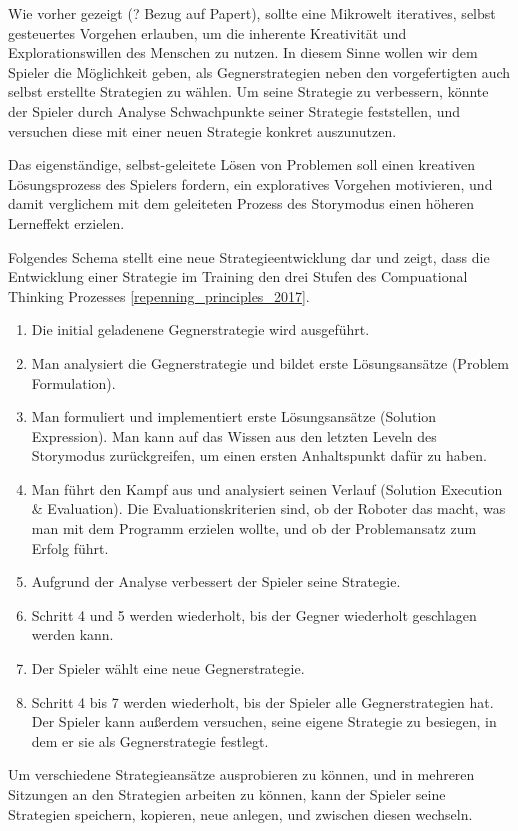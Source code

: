 Wie vorher gezeigt (? Bezug auf Papert), sollte eine Mikrowelt iteratives, selbst gesteuertes
Vorgehen erlauben, um die inherente Kreativität und Explorationswillen des Menschen zu nutzen. In
diesem Sinne wollen wir dem Spieler die Möglichkeit geben, als Gegnerstrategien neben den
vorgefertigten auch selbst erstellte Strategien zu wählen. Um seine Strategie zu verbessern, könnte
der Spieler durch Analyse Schwachpunkte seiner Strategie feststellen, und versuchen diese mit einer neuen
Strategie konkret auszunutzen.

Das eigenständige, selbst-geleitete Lösen von Problemen soll einen kreativen Lösungsprozess des
Spielers fordern, ein exploratives Vorgehen motivieren, und damit verglichem mit dem geleiteten
Prozess des Storymodus einen höheren Lerneffekt erzielen.

Folgendes Schema stellt eine neue Strategieentwicklung dar und zeigt, dass die Entwicklung einer
Strategie im Training den drei Stufen des Compuational Thinking Prozesses \ref{repenning_principles_2017}.

\begin{enumerate}
\item Die initial geladenene Gegnerstrategie wird ausgeführt.
\item Man analysiert die Gegnerstrategie und bildet erste Lösungsansätze (Problem Formulation).
\item Man formuliert und implementiert erste Lösungsansätze (Solution Expression). Man kann auf das Wissen aus den letzten
Leveln des Storymodus zurückgreifen, um einen ersten Anhaltspunkt dafür zu haben.
\item Man führt den Kampf aus und analysiert seinen Verlauf (Solution Execution \& Evaluation). Die Evaluationskriterien sind, ob der Roboter
das macht, was man mit dem Programm erzielen wollte, und ob der Problemansatz zum Erfolg führt.
\item Aufgrund der Analyse verbessert der Spieler seine Strategie.
\item Schritt 4 und 5 werden wiederholt, bis der Gegner wiederholt geschlagen werden kann.
\item Der Spieler wählt eine neue Gegnerstrategie.
\item Schritt 4 bis 7 werden wiederholt, bis der Spieler alle Gegnerstrategien hat. Der Spieler kann außerdem
versuchen, seine eigene Strategie zu besiegen, in dem er sie als Gegnerstrategie festlegt.
\end{enumerate}

Um verschiedene Strategieansätze ausprobieren zu können, und in mehreren Sitzungen an den Strategien
arbeiten zu können, kann der Spieler seine Strategien speichern, kopieren, neue anlegen, und
zwischen diesen wechseln.


